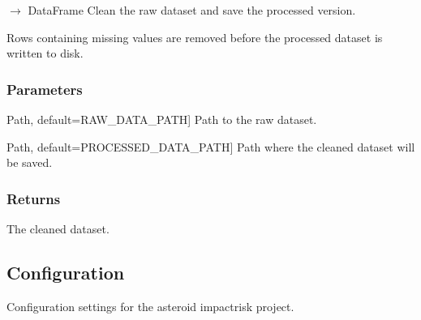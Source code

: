 \documentclass[letterpaper,10pt,english]{sphinxmanual}
\begin{document}
\begin{fulllineitems}
\label{\detokenize{modules:asteroid_impact.features.prepare_dataset}}
\pysigstartsignatures
\pysiglinewithargsret
{}
{\sphinxparamcomma {}}
{{ $\rightarrow$ DataFrame}}
\pysigstopsignatures
\sphinxAtStartPar
Clean the raw dataset and save the processed version.

\sphinxAtStartPar
Rows containing missing values are removed before the processed dataset
is written to disk.


\subsubsection{Parameters}
\label{\detokenize{modules:id7}}\begin{description}
\sphinxlineitem{input\_path}{[}Path, default=RAW\_DATA\_PATH{]}
\sphinxAtStartPar
Path to the raw dataset.

\sphinxlineitem{output\_path}{[}Path, default=PROCESSED\_DATA\_PATH{]}
\sphinxAtStartPar
Path where the cleaned dataset will be saved.

\end{description}


\subsubsection{Returns}
\label{\detokenize{modules:id8}}\begin{description}
\sphinxAtStartPar
The cleaned dataset.

\end{description}

\end{fulllineitems}



\subsection{Configuration}
\label{\detokenize{modules:module-asteroid_impact.config}}\label{\detokenize{modules:configuration}}
\sphinxAtStartPar
Configuration settings for the asteroid impact\sphinxhyphen{}risk project.
\end{document}
